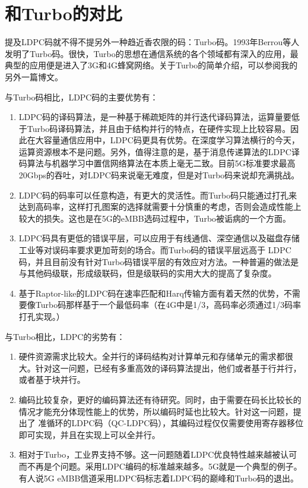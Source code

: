 \documentclass[10pt,a4paper,UTF8]{article}
\begin{document}
\section{和Turbo的对比}
\label{sec:org22c7b0c}


提及LDPC码就不得不提另外一种趋近香农限的码：Turbo码。1993年Berrou等人发明了Turbo码。很快，Turbo的思想在通信系统的各个领域都有深入的应用，最典型的应用便是进入了3G和4G蜂窝网络。关于Turbo的简单介绍，可以参阅我的另外一篇博文。

与Turbo码相比，LDPC码的主要优势有：
\begin{enumerate}
\item LDPC码的译码算法，是一种基于稀疏矩阵的并行迭代译码算法，运算量要低于Turbo码译码算法，并且由于结构并行的特点，在硬件实现上比较容易。因此在大容量通信应用中，LDPC码更具有优势。在深度学习算法横行的今天，运算资源根本不是问题。另外，值得注意的是，基于消息传递算法的LDPC译码算法与机器学习中置信网络算法在本质上毫无二致。目前5G标准要求最高20Gbps的吞吐，对LDPC码来说毫无难度，但是对Turbo码来说却充满挑战。

\item LDPC码的码率可以任意构造，有更大的灵活性。而Turbo码只能通过打孔来达到高码率，这样打孔图案的选择就需要十分慎重的考虑，否则会造成性能上较大的损失。这也是在5G的eMBB选码过程中，Turbo被诟病的一个方面。

\item LDPC码具有更低的错误平层，可以应用于有线通信、深空通信以及磁盘存储工业等对误码率要求更加苛刻的场合。而Turbo码的错误平层远高于 LDPC码，并且目前没有针对Turbo码错误平层的有效应对方法。一种普遍的做法是与其他码级联，形成级联码，但是级联码的实用大大的提高了复杂度。

\item 基于Raptor-like的LDPC码在速率匹配和Harq传输方面有着天然的优势，不需要像Turbo码那样基于一个最低码率（在4G中是1/3，高码率必须通过1/3码率打孔实现。）
\end{enumerate}

与Turbo相比，LDPC的劣势有：

\begin{enumerate}
\item 硬件资源需求比较大。全并行的译码结构对计算单元和存储单元的需求都很大。针对这一问题，已经有多重高效的译码算法提出，他们或者基于行并行，或者基于块并行。

\item 编码比较复杂，更好的编码算法还有待研究。同时，由于需要在码长比较长的情况才能充分体现性能上的优势，所以编码时延也比较大。针对这一问题，提出了 准循环的LDPC码（QC-LDPC码），其编码过程仅仅需要使用寄存器移位即可实现，并且在实现上可以全并行。

\item 相对于Turbo，工业界支持不够。这一问题随着LDPC优良特性越来越被认可而不再是个问题。采用LDPC编码的标准越来越多。5G就是一个典型的例子。有人说5G eMBB信道采用LDPC码标志着LDPC码的巅峰和Turbo码的退出。
\end{enumerate}
\end{document}
